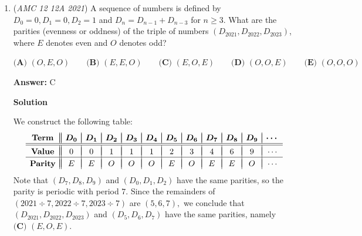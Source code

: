 \begin{enumerate}
\textbf{Solution 3 (Beyond Overkill )}

Like solution 1, expand and simplify the original equation to $x^2+y^2+x^2y^2+1$ and let $f(x, y) = x^2+y^2+x^2y^2+1$. To find local extrema, find where $\nabla f(x, y) = \boldsymbol{0}$. First, find the first partial derivative with respect to x and y and find where they are $0$:
 \[\frac{\partial f}{\partial x} = 2x + 2xy^{2} = 2x(1 + y^{2}) = 0 \implies x = 0\]
 \[\frac{\partial f}{\partial y} = 2y + 2yx^{2} = 2y(1 + x^{2}) = 0 \implies y = 0\]Thus, there is a local extremum at $(0, 0)$. Because this is the only extremum, we can assume that this is a minimum because the problem asks for the minimum (though this can also be proven using the partial second derivative test) and the global minimum since it's the only minimum, meaning $f(0, 0)$ is the minimum of $f(x, y)$. Plugging $(0, 0)$ into $f(x, y)$, we find 1 $\implies \boxed{\textbf{(D)} ~1}$.

 Remark:Honestly, this isn't even that overkill. I did it this way, and it was not very bashy.~vaishnav

 Note: the problem where this is linked is covered 0:21-0:50

 


	\item (\textit{AMC 12 12A 2021}) A sequence of numbers is defined by $D_0=0,D_1=0,D_2=1$ and $D_n=D_{n-1}+D_{n-3}$ for $n\ge 3$. What are the parities (evenness or oddness) of the triple of numbers $(D_{2021},D_{2022},D_{2023})$, where $E$ denotes even and $O$ denotes odd?


 $\textbf{(A) }(O,E,O) \qquad \textbf{(B) }(E,E,O) \qquad \textbf{(C) }(E,O,E) \qquad \textbf{(D) }(O,O,E) \qquad \textbf{(E) }(O,O,O)$

 \textbf{Answer: }C



\textbf{Solution}

We construct the following table:
 \[\begin{array}{c||c|c|c|c|c|c|c|c|c|c|c}    &&&&&&&&&&& \\ [-2.5ex] \textbf{Term} &\boldsymbol{D_0}&\boldsymbol{D_1}&\boldsymbol{D_2}&\boldsymbol{D_3}&\boldsymbol{D_4}&\boldsymbol{D_5}&\boldsymbol{D_6}&\boldsymbol{D_7}&\boldsymbol{D_8}&\boldsymbol{D_9}&\boldsymbol{\cdots} \\  \hline \hline &&&&&&&&&&& \\ [-2.25ex] \textbf{Value} & 0&0&1&1&1&2&3&4&6&9&\cdots \\ \hline   &&&&&&&&&&& \\ [-2.25ex] \textbf{Parity} & E&E&O&O&O&E&O&E&E&O&\cdots \end{array}\]Note that $(D_7,D_8,D_9)$ and $(D_0,D_1,D_2)$ have the same parities, so the parity is periodic with period $7.$ Since the remainders of $(2021\div7,2022\div7,2023\div7)$ are $(5,6,7),$ we conclude that $(D_{2021},D_{2022},D_{2023})$ and $(D_5,D_6,D_7)$ have the same parities, namely $\boxed{\textbf{(C) }(E,O,E)}.$




\end{enumerate}
